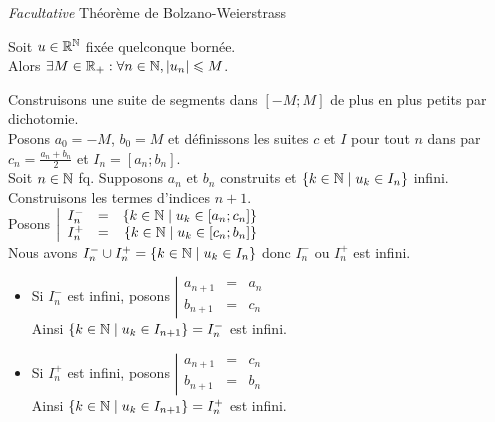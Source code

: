 \documentclass{article}
\renewenvironment{question_kholle}[2][ ]
{
	\subsection{\texorpdfstring{#2}{}}
	\notblank{#1}
	{
		\noindent #1
		\bigbreak
	}
	{}
	\begin{proof}
}
{
	\end{proof}
}
\begin{document}
\begin{question_kholle}
	{\emph{Facultative} Théorème de Bolzano-Weierstrass}

	Soit $u \in \mathbb R^{\mathbb N}$ fixée quelconque bornée. \\
	Alors $\exists M \in \mathbb R_+ : \forall n \in \mathbb N, |u_n| \leqslant M$.

	Construisons une suite de segments dans $[-M;M]$ de plus en plus
	petits par dichotomie. \\
	Posons $a_0 = -M$, $b_0 = M$ et définissons les suites $c$ et $I$
	pour tout $n$ dans \N par $c_n = \frac{a_n + b_n}{2}$ et $I_n = [a_n;b_n]$. \\

	\noindent Soit $n\in \mathbb N$ fq.
	Supposons $a_n \text{ et } b_n$ construits et $\{ k \in \mathbb N \;|\;
		u_k \in I_n \}$ infini.
	Construisons les termes d'indices $n+1$. \\
	Posons $\left|
		\begin{array}{lcr}
			I_n^- & = & \{ k \in \mathbb N \;|\; u_k \in [a_n;c_n] \} \\
			I_n^+ & = & \{ k \in \mathbb N \;|\; u_k \in [c_n;b_n] \} \\
		\end{array} \right.$ \\
	Nous avons $I_n^- \cup I_n^+ = \{ k \in \mathbb N \;|\; u_k \in I_n \}$
	donc $I_n^-$ ou $I_n^+$ est infini.

	\begin{itemize}
		\item Si $I_n^-$ est infini, posons $\left|
			      \begin{array}{lcl}
				      a_{n+1} & = & a_n \\
				      b_{n+1} & = & c_n
			      \end{array} \right.$ \\
		      Ainsi $\{ k \in \mathbb N \;|\; u_k \in I_{n+1} \} = I_n^-$ est infini.
		\item Si $I_n^+$ est infini, posons $\left|
			      \begin{array}{lcl}
				      a_{n+1} & = & c_n \\
				      b_{n+1} & = & b_n
			      \end{array} \right.$ \\
		      Ainsi $\{ k \in \mathbb N \;|\; u_k \in I_{n+1} \} = I_n^+$ est infini.
	\end{itemize}
	\bigbreak


\end{question_kholle}
\end{document}

